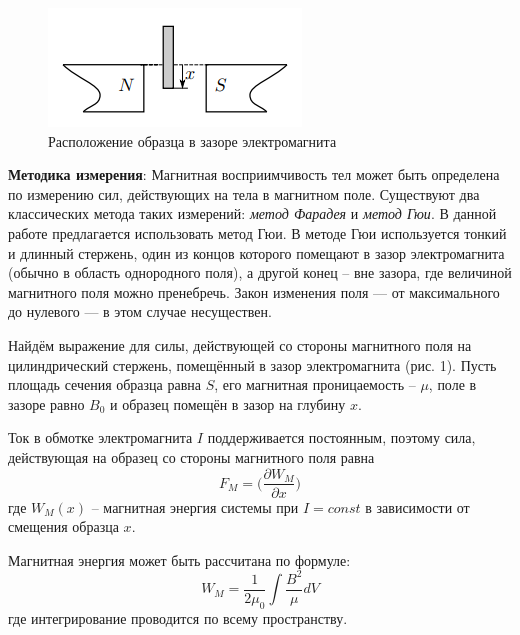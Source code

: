 \documentclass[a4paper,12pt]{article}
\begin{document}
\begin{figure}\label{fig: образец в поле}
    \begin{center}
    \vspace{-30pt}
        \includegraphics[width = \textwidth]{Образец в зазоре.png}
    \end{center}
    \caption{Расположение образца в зазоре электромагнита}
\end{figure}

\textbf{Методика измерения}:
Магнитная восприимчивость тел может быть определена по измерению сил, действующих на тела в магнитном поле. Существуют два классических метода таких измерений: \textit{метод Фарадея} и \textit{метод Гюи}. В данной работе предлагается использовать метод Гюи. В методе Гюи используется тонкий и длинный стержень, один из концов которого помещают в зазор электромагнита (обычно в область однородного поля), а другой конец -- вне зазора, где величиной магнитного поля можно пренебречь. Закон изменения поля — от максимального до нулевого — в этом случае несуществен. 

Найдём выражение для силы, действующей со стороны магнитного поля на цилиндрический стержень, помещённый в зазор электромагнита (рис. 1). Пусть
площадь сечения образца равна $S$, его магнитная проницаемость -- $\mu$, поле в зазоре равно $B_0$ и образец помещён в зазор на глубину $x$.

Ток в обмотке электромагнита $I$ поддерживается постоянным, поэтому сила, действующая на образец со стороны магнитного поля равна
\[F_M = \Big( \frac{\partial W_M}{\partial x}\Big)\]
где $W_M(x)$ -- магнитная энергия системы при $I = const$ в зависимости от смещения образца $x$.

Магнитная энергия может быть рассчитана по формуле:
\[W_M = \frac{1}{2\mu_0} \int \frac{B^2}{\mu} dV\]
где интегрирование проводится по всему пространству.
\end{document}
